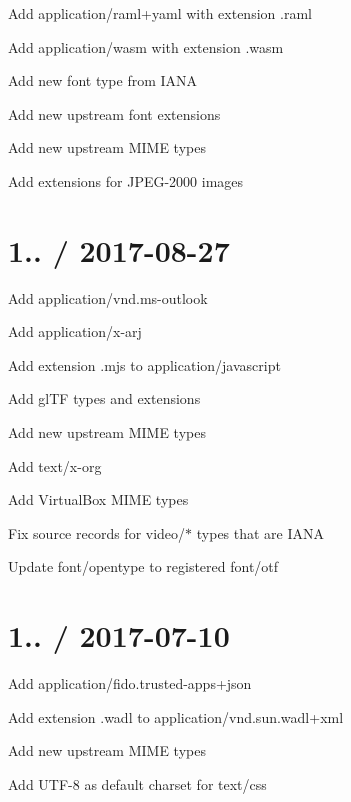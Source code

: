 \begin{DoxyItemize}
\item Add {\ttfamily application/raml+yaml} with extension {\ttfamily .raml}
\item Add {\ttfamily application/wasm} with extension {\ttfamily .wasm}
\item Add new {\ttfamily font} type from I\+A\+NA
\item Add new upstream font extensions
\item Add new upstream M\+I\+ME types
\item Add extensions for J\+P\+E\+G-\/2000 images
\end{DoxyItemize}

\section*{1.. / 2017-\/08-\/27 }


\begin{DoxyItemize}
\item Add {\ttfamily application/vnd.\+ms-\/outlook}
\item Add {\ttfamily application/x-\/arj}
\item Add extension {\ttfamily .mjs} to {\ttfamily application/javascript}
\item Add gl\+TF types and extensions
\item Add new upstream M\+I\+ME types
\item Add {\ttfamily text/x-\/org}
\item Add Virtual\+Box M\+I\+ME types
\item Fix {\ttfamily source} records for {\ttfamily video/$\ast$} types that are I\+A\+NA
\item Update {\ttfamily font/opentype} to registered {\ttfamily font/otf}
\end{DoxyItemize}

\section*{1.. / 2017-\/07-\/10 }


\begin{DoxyItemize}
\item Add {\ttfamily application/fido.\+trusted-\/apps+json}
\item Add extension {\ttfamily .wadl} to {\ttfamily application/vnd.\+sun.\+wadl+xml}
\item Add new upstream M\+I\+ME types
\item Add {\ttfamily U\+T\+F-\/8} as default charset for {\ttfamily text/css}
\end{DoxyItemize}

